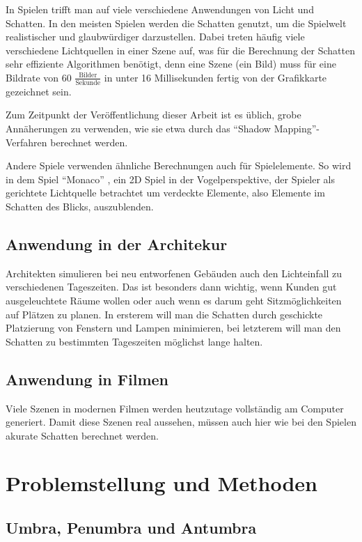 \documentclass[10pt,twocolumn]{scrartcl}
\begin{document}
In Spielen trifft man auf viele verschiedene Anwendungen von Licht und Schatten. In den meisten
Spielen werden die Schatten genutzt, um die Spielwelt realistischer und glaubwürdiger darzustellen.
Dabei treten häufig viele verschiedene Lichtquellen in einer Szene auf, was für die Berechnung der
Schatten sehr effiziente Algorithmen benötigt, denn eine Szene (ein Bild) muss für eine Bildrate
von 60 $\frac{\text{Bilder}}{\text{Sekunde}}$ in unter 16 Millisekunden fertig von der Grafikkarte gezeichnet sein.

Zum Zeitpunkt der Veröffentlichung dieser Arbeit ist es üblich, grobe Annäherungen zu verwenden,
wie sie etwa durch das ``Shadow Mapping''-Verfahren berechnet werden.

Andere Spiele verwenden ähnliche Berechnungen auch für Spielelemente. So wird in dem Spiel ``Monaco'' \cite{monaco2014},
ein 2D Spiel in der Vogelperspektive, der Spieler als gerichtete Lichtquelle betrachtet um verdeckte
Elemente, also Elemente im Schatten des Blicks, auszublenden.

\subsection{Anwendung in der Architekur}

Architekten simulieren bei neu entworfenen Gebäuden auch den Lichteinfall zu verschiedenen Tageszeiten.
Das ist besonders dann wichtig, wenn Kunden gut ausgeleuchtete Räume wollen oder auch wenn es darum geht
Sitzmöglichkeiten auf Plätzen zu planen. In ersterem will man die Schatten durch geschickte Platzierung
von Fenstern und Lampen minimieren, bei letzterem will man den Schatten zu bestimmten Tageszeiten
möglichst lange halten.

\subsection{Anwendung in Filmen}

Viele Szenen in modernen Filmen werden heutzutage vollständig am Computer generiert. Damit diese Szenen
real aussehen, müssen auch hier wie bei den Spielen akurate Schatten berechnet werden.

\section{Problemstellung und Methoden}

\subsection{Umbra, Penumbra und Antumbra}
\end{document}
